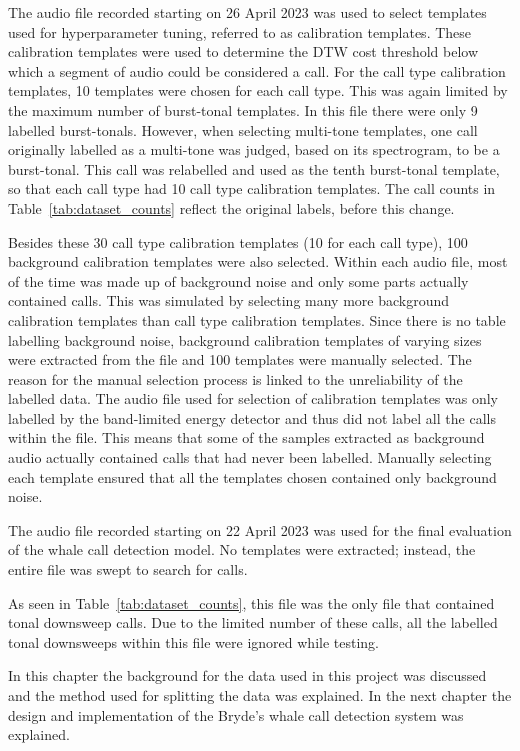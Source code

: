The audio file recorded starting on 26 April 2023 was used to select templates used for hyperparameter
tuning, referred to as calibration templates. These calibration templates were used to determine the \acs{DTW} cost threshold below which a
segment of audio could be considered a call. For the call type calibration templates, 10 templates were chosen for each call type. This was
again limited by the maximum number of burst-tonal templates. In this file there were only 9 labelled burst-tonals. However, when selecting
multi-tone templates, one call originally labelled as a multi-tone was judged,
based on its spectrogram, to be a burst-tonal. This call was relabelled and used
as the tenth burst-tonal template, so that each call type had 10 call type calibration
templates. The call counts in Table~\ref{tab:dataset_counts} reflect the
original labels, before this change.

Besides these 30 call type calibration templates (10 for each call type), 100 background calibration templates were also selected.
Within each audio file, most of the time was made up of background
noise and only some parts actually contained calls.
This was simulated by selecting many more background calibration templates than call type calibration templates. Since there
is no table
labelling background noise, background calibration templates of varying sizes were extracted from the file and 100 templates
were manually selected. The reason for the manual selection process
is linked to the unreliability of the labelled data. The audio file used for selection of calibration templates was only labelled by
the band-limited energy detector and thus did not label all the calls
within the file. This means that some of the samples extracted as background audio actually contained calls that had never been labelled.
Manually selecting each template
ensured that all the templates chosen contained only background noise.

\label{sec:eval_dat_sel}

The audio file recorded starting on 22 April 2023 was used for the final evaluation of the whale
call detection model. No templates were extracted; instead, the entire file was swept to search for calls.

As seen in Table~\ref{tab:dataset_counts}, this file was the only file that contained tonal downsweep calls. Due to the limited number of these
calls, all the labelled tonal downsweeps within this file
were ignored while testing.


In this chapter the background for the data used in this project was discussed and the method used for splitting the data was explained. 
In the next chapter the design and implementation of the Bryde's whale call detection system was explained.